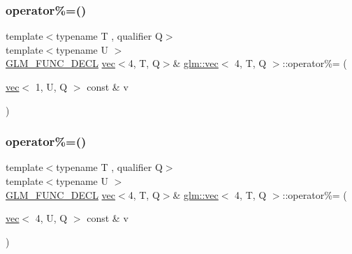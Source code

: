\mbox{\label{structglm_1_1vec_3_014_00_01_t_00_01_q_01_4_af2437a9e70535d7ae0c01c7be439c209}} 
\subsubsection{\texorpdfstring{operator\%=()}{operator\%=()}\hspace{0.1cm}{\footnotesize\ttfamily [2/6]}}
{\footnotesize\ttfamily template$<$typename T , qualifier Q$>$ \\
template$<$typename U $>$ \\
\hyperlink{setup_8hpp_ab2d052de21a70539923e9bcbf6e83a51}{G\+L\+M\+\_\+\+F\+U\+N\+C\+\_\+\+D\+E\+CL} \hyperlink{structglm_1_1vec}{vec}$<$4, T, Q$>$\& \hyperlink{structglm_1_1vec}{glm\+::vec}$<$ 4, T, Q $>$\+::operator\%= (\begin{DoxyParamCaption}\item[{\hyperlink{structglm_1_1vec}{vec}$<$ 1, U, Q $>$ const \&}]{v }\end{DoxyParamCaption})}

\mbox{\label{structglm_1_1vec_3_014_00_01_t_00_01_q_01_4_a10da98a89881a5135b526ceaa75c6f13}} 
\subsubsection{\texorpdfstring{operator\%=()}{operator\%=()}\hspace{0.1cm}{\footnotesize\ttfamily [3/6]}}
{\footnotesize\ttfamily template$<$typename T , qualifier Q$>$ \\
template$<$typename U $>$ \\
\hyperlink{setup_8hpp_ab2d052de21a70539923e9bcbf6e83a51}{G\+L\+M\+\_\+\+F\+U\+N\+C\+\_\+\+D\+E\+CL} \hyperlink{structglm_1_1vec}{vec}$<$4, T, Q$>$\& \hyperlink{structglm_1_1vec}{glm\+::vec}$<$ 4, T, Q $>$\+::operator\%= (\begin{DoxyParamCaption}\item[{\hyperlink{structglm_1_1vec}{vec}$<$ 4, U, Q $>$ const \&}]{v }\end{DoxyParamCaption})}

